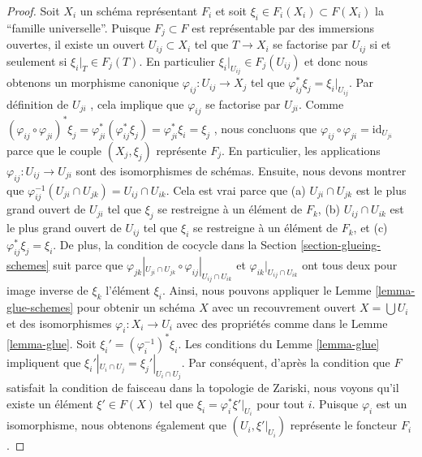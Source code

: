 \begin{proof}
Soit  $X_i$  un schéma représentant  $F_i$  et soit  $\xi_i \in F_i(X_i) \subset F(X_i)$  la
``famille universelle''. Puisque  $F_j \subset F$  est représentable par des immersions
ouvertes, il existe un ouvert  $U_{ij} \subset X_i$  tel que  $T \to X_i$  se factorise par
 $U_{ij}$  si et seulement si  $\xi_i|_T \in F_j(T)$. En particulier  $\xi_i|_{U_{ij}} \in F_j(U_{ij})$  et donc
nous obtenons un morphisme canonique  $\varphi_{ij} : U_{ij} \to X_j$  tel que  $\varphi_{ij}^*\xi_j = \xi_i|_{U_{ij}}$. Par
définition de  $U_{ji}$ , cela implique que  $\varphi_{ij}$  se factorise par
 $U_{ji}$. Comme  $(\varphi_{ij} \circ \varphi_{ji})^*\xi_j
=\varphi_{ji}^*(\varphi_{ij}^*\xi_j) =
\varphi_{ji}^*\xi_i = \xi_j$ , nous concluons que  $\varphi_{ij} \circ \varphi_{ji} = \text{id}_{U_{ji}}$  parce que le
couple  $(X_j, \xi_j)$  représente  $F_j$. En particulier, les applications
 $\varphi_{ij} : U_{ij} \to U_{ji}$  sont des isomorphismes de schémas. Ensuite, nous devons montrer que
 $\varphi_{ij}^{-1}(U_{ji} \cap U_{jk}) = U_{ij} \cap U_{ik}$. Cela est vrai parce que (a)  $U_{ji} \cap U_{jk}$  est le plus grand ouvert
de  $U_{ji}$  tel que  $\xi_j$  se restreigne à un élément de  $F_k$,
(b)  $U_{ij} \cap U_{ik}$  est le plus grand ouvert de  $U_{ij}$  tel que  $\xi_i$ 
se restreigne à un élément de  $F_k$, et (c)  $\varphi_{ij}^*\xi_j = \xi_i$. De plus, la
condition de cocycle dans la Section  \ref{section-glueing-schemes}  suit parce que  $\varphi_{jk}|_{U_{ji} \cap U_{jk}} \circ
\varphi_{ij}|_{U_{ij} \cap U_{ik}}$  et
 $\varphi_{ik}|_{U_{ij} \cap U_{ik}}$  ont tous deux pour image inverse de  $\xi_k$  l'élément  $\xi_i$. Ainsi, nous pouvons
appliquer le Lemme  \ref{lemma-glue-schemes}  pour obtenir un schéma  $X$  avec un
recouvrement ouvert  $X = \bigcup U_i$  et des isomorphismes  $\varphi_i : X_i \to U_i$  avec des
propriétés comme dans le Lemme  \ref{lemma-glue}. Soit  $\xi_i' = (\varphi_i^{-1})^* \xi_i$. Les conditions du
Lemme  \ref{lemma-glue}  impliquent que  $\xi_i'|_{U_i \cap U_j} = \xi_j'|_{U_i \cap U_j}$. Par conséquent, d'après la
condition que  $F$  satisfait la condition de faisceau dans la topologie de
Zariski, nous voyons qu'il existe un élément  $\xi' \in F(X)$  tel que  $\xi_i = \varphi_i^*\xi'|_{U_i}$ 
pour tout  $i$. Puisque  $\varphi_i$  est un isomorphisme, nous obtenons
également que  $(U_i, \xi'|_{U_i})$  représente le foncteur  $F_i$.


\end{proof}
